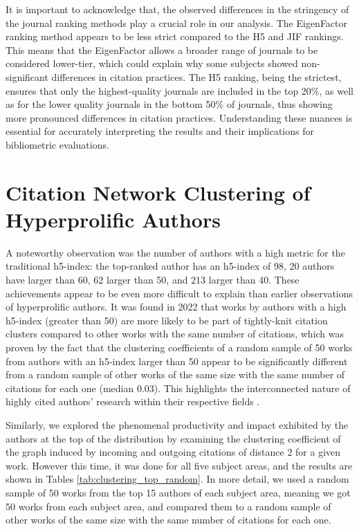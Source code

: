 It is important to acknowledge that, the observed differences in the stringency
of the journal ranking methods play a crucial role in our analysis. The
EigenFactor ranking method appears to be less strict compared to the H5 and JIF
rankings. This means that the EigenFactor allows a broader range of journals to
be considered lower-tier, which could explain why some subjects showed
non-significant differences in citation practices. The H5 ranking, being the
strictest, ensures that only the highest-quality journals are included in the
top 20\%, as well as for the lower quality journals in the bottom 50\% of
journals, thus showing more pronounced differences in citation practices.
Understanding these nuances is essential for accurately interpreting the
results and their implications for bibliometric evaluations.

\section{Citation Network Clustering of Hyperprolific Authors}

A noteworthy observation was the number of authors with a high metric for the
traditional h5-index: the top-ranked author has an h5-index of 98, 20 authors
have larger than 60, 62 larger than 50, and 213 larger than 40. These
achievements appear to be even more difficult to explain than earlier
observations of hyperprolific authors. It was found in 2022 that works by
authors with a high h5-index (greater than 50) are more likely to be part of
tightly-knit citation clusters compared to other works with the same number of
citations, which was proven by the fact that the clustering coefficients of a
random sample of 50 works from authors with an h5-index larger than 50 appear
to be significantly different from a random sample of other works of the same
size with the same number of citations for each one (median 0.03). This
highlights the interconnected nature of highly cited authors' research within
their respective fields \cite{Spi23g}.

Similarly, we explored the phenomenal productivity and impact exhibited by the
authors at the top of the distribution by examining the clustering coefficient
of the graph induced by incoming and outgoing citations of distance 2 for a
given work. However this time, it was done for all five subject areas, and the
results are shown in Tables \ref{tab:clustering_top_random}. In more detail, we
used a random sample of 50 works from the top 15 authors of each subject area,
meaning we got 50 works from each subject area, and compared them to a random
sample of other works of the same size with the same number of citations for
each one. %

